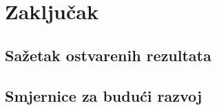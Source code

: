\chapter{Zaključak}

\section{Sažetak ostvarenih rezultata}

\section{Smjernice za budući razvoj}



